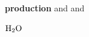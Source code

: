 \documentclass{article}
\begin{document}
\textbf{ production} and \textsf{} and \textit{}

\textbf{$\ce{H2O}$}
\end{document}
